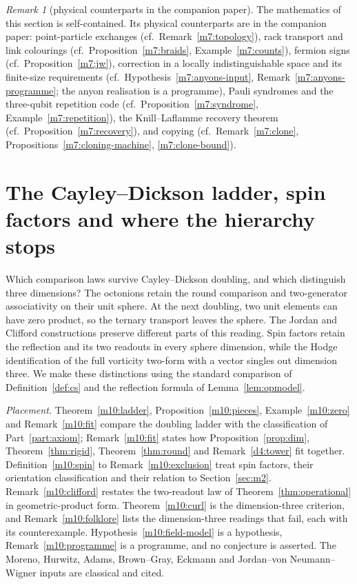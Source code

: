 \documentclass[11pt,reqno]{amsart}
\theoremstyle{definition}
\theoremstyle{remark}
\newtheorem{remark}[theorem]{Remark}
\numberwithin{equation}{section}
\begin{document}
\begin{remark}[physical counterparts in the companion paper]\label{m7:companion}
The mathematics of this section is self-contained.  Its physical counterparts are in the companion paper: point-particle exchanges
\cite[Prop.~138]{Companion} (cf.\ Remark~\ref{m7:topology}), rack transport and link colourings \cite[Prop.~139 and Ex.~140]{Companion}
(cf.\ Proposition~\ref{m7:braids}, Example~\ref{m7:counts}), fermion signs \cite[Prop.~141]{Companion} (cf.\ Proposition~\ref{m7:jw}),
correction in a locally indistinguishable space and its finite-size requirements \cite[Cor.~142, Rem.~143]{Companion}
(cf.\ Hypothesis~\ref{m7:anyons-input}, Remark~\ref{m7:anyons-programme}; the anyon realisation is a programme), Pauli syndromes and the
three-qubit repetition code \cite[Prop.~124, Ex.~125]{Companion} (cf.\ Proposition~\ref{m7:syndrome}, Example~\ref{m7:repetition}), the
Knill--Laflamme recovery theorem \cite[Thm.~122]{Companion} (cf.\ Proposition~\ref{m7:recovery}), and copying
\cite[Props.~120, 121]{Companion} (cf.\ Remark~\ref{m7:clone}, Propositions~\ref{m7:cloning-machine}, \ref{m7:clone-bound}).
\end{remark}

\section{The Cayley--Dickson ladder, spin factors and where the hierarchy stops}
\label{sec:m10}

Which comparison laws survive Cayley--Dickson doubling, and which distinguish
three dimensions? The octonions retain the round comparison and
two-generator associativity on their unit sphere. At the next doubling, two
unit elements can have zero product, so the ternary transport leaves the
sphere. The Jordan and Clifford constructions preserve different parts of
this reading. Spin factors retain the reflection and its two readouts in
every sphere dimension, while the Hodge identification of the full
vorticity two-form with a vector singles out dimension three. We make
these distinctions using the standard comparison of
Definition~\ref{def:cs} and the reflection formula of
Lemma~\ref{lem:opmodel}.

\emph{Placement.} Theorem~\ref{m10:ladder}, Proposition~\ref{m10:pieces},
Example~\ref{m10:zero} and Remark~\ref{m10:fit} compare the doubling
ladder with the classification of Part~\ref{part:axiom}; Remark~\ref{m10:fit}
states how Proposition~\ref{prop:dim}, Theorem~\ref{thm:rigid},
Theorem~\ref{thm:round} and Remark~\ref{d4:tower} fit together.
Definition~\ref{m10:spin} to Remark~\ref{m10:exclusion} treat spin factors,
their orientation classification and their relation to
Section~\ref{sec:m2}. Remark~\ref{m10:clifford} restates the two-readout
law of Theorem~\ref{thm:operational} in geometric-product form.
Theorem~\ref{m10:curl} is the dimension-three criterion, and
Remark~\ref{m10:folklore} lists the dimension-three readings that fail,
each with its counterexample. Hypothesis~\ref{m10:field-model} is a
hypothesis, Remark~\ref{m10:programme} is a programme, and no conjecture is
asserted. The Moreno, Hurwitz, Adams, Brown--Gray, Eckmann and
Jordan--von Neumann--Wigner inputs are classical and cited.
\end{document}
